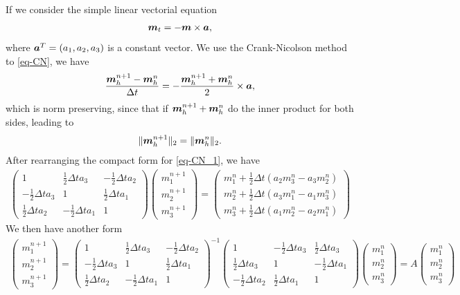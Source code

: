 \documentclass[preprint,times,3p]{elsarticle}
\def\a{\mbox{\boldmath $a$}}
\def\m{\mbox{\boldmath $m$}}
\begin{document}
If we consider the simple linear vectorial equation 
\begin{align}\label{eq-CN}
\m_t=-\m\times \a,
\end{align}
where $\a^T=(a_1,a_2,a_3)$ is a constant vector. We use the Crank-Nicolson method to \cref{eq-CN}, we have
\begin{align}\label{eq-CN_1}
	\frac{\m_h^{n+1}-\m_h^n}{\Delta t}=-\frac{\m_h^{n+1}+\m_h^n}{2} \times \a,
\end{align}
which is norm preserving, since that if $\m_h^{n+1}+\m_h^n$ do the inner product for both sides, leading to
\begin{align*}
	\|\m_h^{n+1}\|_2=\|\m_h^n\|_2.
\end{align*}
After rearranging the compact form for \cref{eq-CN_1}, we have
\begin{align*}
	\begin{pmatrix}
	1&\frac12 \Delta t a_3&-\frac12 \Delta t a_2\\
	-\frac12 \Delta ta_3&1&\frac12 \Delta ta_1\\
	\frac12 \Delta ta_2&-\frac12 \Delta t a_1&1
	\end{pmatrix}\begin{pmatrix}
	m_1^{n+1}\\
	m_2^{n+1}\\
	m_3^{n+1}
	\end{pmatrix}=\begin{pmatrix}
	m_1^n+\frac12 \Delta t(a_2 m_3^n-a_3 m_2^n)\\
	m_2^n+\frac12 \Delta t(a_3 m_1^n-a_1 m_3^n)\\
	m_3^n+\frac12 \Delta t(a_1m_2^n-a_2 m_1^n)
	\end{pmatrix}
\end{align*}
We then have another form
\begin{align*}
	\begin{pmatrix}
	m_1^{n+1}\\
	m_2^{n+1}\\
	m_3^{n+1}
	\end{pmatrix}=\begin{pmatrix}
	1&\frac12 \Delta t a_3&-\frac12 \Delta t a_2\\
	-\frac12 \Delta ta_3&1&\frac12 \Delta ta_1\\
	\frac12 \Delta ta_2&-\frac12 \Delta t a_1&1
	\end{pmatrix}^{-1}\begin{pmatrix}
	1&-\frac12 \Delta t a_3 & \frac12 \Delta t a_3\\
	\frac12 \Delta t a_3&1& -\frac12 \Delta t a_1\\
	-\frac12 \Delta t a_2&\frac12 \Delta t a_1&1
	\end{pmatrix}\begin{pmatrix}
	m_1^n\\
	m_2^n\\
	m_3^n
	\end{pmatrix}=A\begin{pmatrix}
	m_1^n\\
	m_2^n\\
	m_3^n
	\end{pmatrix}
\end{align*}
\end{document}
